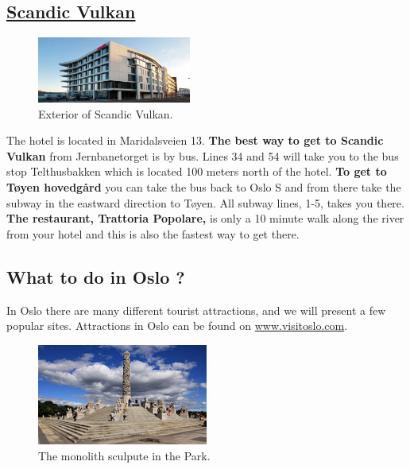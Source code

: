 \documentclass{article}
\begin{document}
\subsection*{\underline{Scandic Vulkan}}
\begin{figure}
\centering
\includegraphics[width=0.45\textwidth, height=0.3\textwidth]{img/scandic-vulkan.jpg}
\caption{\label{fig:frog1}Exterior of Scandic Vulkan.}
\end{figure}
The hotel is located in Maridalsveien 13.
\textbf{The best way to get to Scandic Vulkan} from
Jernbanetorget is by bus. Lines 34 and 54 will take you
to the bus stop Telthusbakken which is located 100 meters
north of the hotel. \textbf{To get to Tøyen hovedgård}
you can take the bus back to Oslo S and from there take
the subway in the eastward direction to Tøyen. All subway
lines, 1-5, takes you there. \textbf{The restaurant, Trattoria Popolare,}
is only a 10 minute walk along the river
 from your hotel and this is also
the fastest way to get there.



\clearpage
\begin{center}


\section*{What to do in Oslo ?}
In Oslo there are many different tourist attractions, and we will present a few  popular sites. Attractions in Oslo can be found on \href{www.visitoslo.com}{www.visitoslo.com}.


\end{center}
\begin{figure}
    \centering
    \captionsetup{width=0.4\textwidth}
    \includegraphics[width=0.5\textwidth]{img/Vigelansparken.jpg}%
     \caption{The monolith sculpute in the Park.}
\end{figure}
\end{document}
